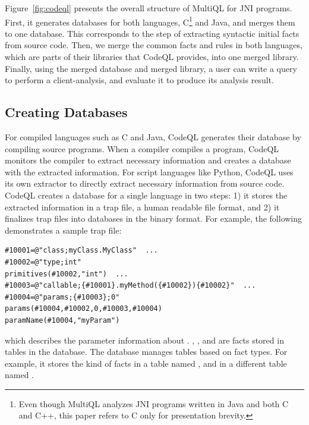 Figure~\ref{fig:codeql} presents the overall structure of MultiQL for JNI
programs.  First, it generates databases for both languages, C\footnote{ Even
though MultiQL analyzes JNI programs written in Java and both C and C++, this
paper refers to C only for presentation brevity.} and Java, and merges them to
one database.  This corresponds to the step of extracting syntactic initial
facts from source code.  Then, we merge the common facts and rules in both
languages, which are parts of their libraries that CodeQL provides, into one
merged library.  Finally, using the merged database and merged library, a user
can write a query to perform a client-analysis, and evaluate it to produce its
analysis result.

\subsection{Creating Databases}
For compiled languages such as C and Java, CodeQL generates their database by
compiling source programs.  When a compiler compiles a program, CodeQL monitors
the compiler to extract necessary information and creates a database with the
extracted information. For script languages like Python, CodeQL uses its own
extractor to directly extract necessary information from source code.
CodeQL creates a database for a single language in two steps:
1) it stores the extracted information in a trap
file, a human readable file format, and 2) it finalizes trap files
into databases in the binary format. For example, the
following demonstrates a sample trap file:

\begin{lstlisting}[style=java,numbers=none]
#10001=@"class;myClass.MyClass"  ...
#10002=@"type;int"
primitives(#10002,"int")  ...
#10003=@"callable;{#10001}.myMethod({#10002}){#10002}"  ...
#10004=@"params;{#10003};0"
params(#10004,#10002,0,#10003,#10004)
paramName(#10004,"myParam")
\end{lstlisting}

\noindent
which describes the parameter information about .
, , and
 are facts stored in tables in the database.  The
database manages tables based on fact types. For example, it stores the kind of
facts  in a table named , and
 in a different table named .


